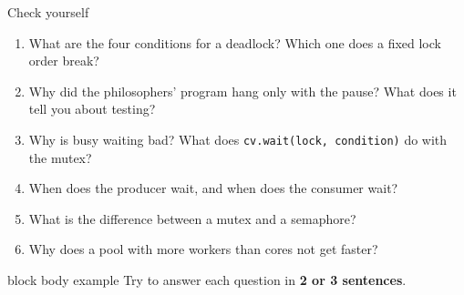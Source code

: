 \documentclass[aspectratio=169,10pt]{beamer}
\newcommand{\keymsg}[1]{%
  \begin{beamercolorbox}[rounded=true,sep=0.1cm,wd=\textwidth]{block body example}
    \centering\footnotesize #1
  \end{beamercolorbox}}
\begin{document}
\begin{frame}{Check yourself}
  \vfill
  \footnotesize
  \begin{enumerate}\setlength{\itemsep}{6pt}
    \item What are the four conditions for a deadlock? Which one does a fixed lock order break?
    \item Why did the philosophers' program hang only with the pause? What does it tell you about testing?
    \item Why is busy waiting bad? What does \texttt{cv.wait(lock, condition)} do with the mutex?
    \item When does the producer wait, and when does the consumer wait?
    \item What is the difference between a mutex and a semaphore?
    \item Why does a pool with more workers than cores not get faster?
  \end{enumerate}
  \vfill
  \keymsg{Try to answer each question in \textbf{2 or 3 sentences}.}
\end{frame}
\end{document}
